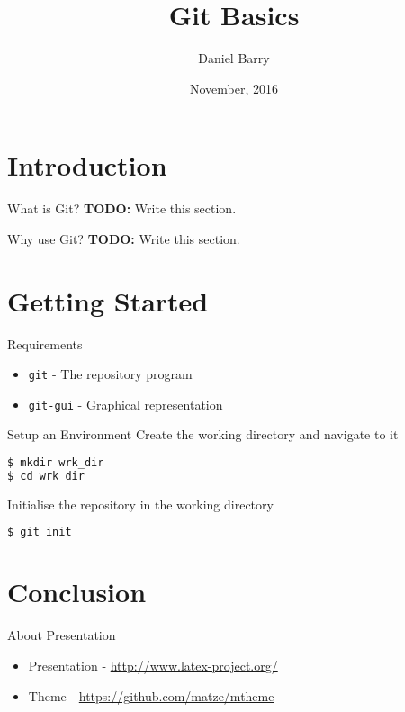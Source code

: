 \documentclass{beamer}
\title{Git Basics}
\date{November, 2016}
\author{Daniel Barry}
\institute{University of Hertfordshire}
\begin{document}
  \maketitle
  \section{Introduction}
  \begin{frame}{What is Git?}
    \textbf{TODO:} Write this section.
  \end{frame}
  \begin{frame}{Why use Git?}
    \textbf{TODO:} Write this section.
  \end{frame}
  \section{Getting Started}
  \begin{frame}{Requirements}
    \begin{itemize}
      \item \texttt{git} - The repository program
      \item \texttt{git-gui} - Graphical representation
    \end{itemize}
  \end{frame}
  \begin{frame}[fragile=singleslide]{Setup an Environment}
    Create the working directory and navigate to it
    \begin{lstlisting}[language=bash]
$ mkdir wrk_dir
$ cd wrk_dir
    \end{lstlisting}
    Initialise the repository in the working directory
    \begin{lstlisting}[language=bash]
$ git init
    \end{lstlisting}
  \end{frame}
  \section{Conclusion}
  \begin{frame}{About Presentation}
    \begin{itemize}
      \item Presentation - \url{http://www.latex-project.org/}
      \item Theme - \url{https://github.com/matze/mtheme}
    \end{itemize}
  \end{frame}
\end{document}
